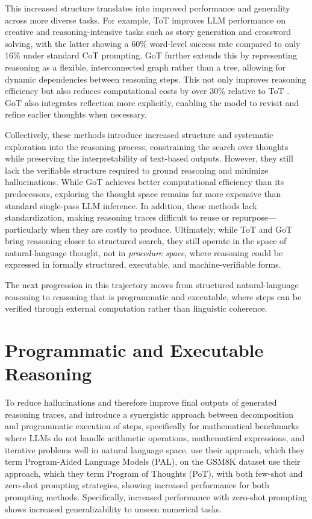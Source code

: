 \documentclass[project]{bsu-cs}  %
\begin{document}
This increased structure translates into improved performance and generality across more diverse tasks. For example, ToT improves LLM performance on creative and reasoning-intensive tasks such as story generation and crossword solving, with the latter showing a 60\% word-level success rate compared to only 16\% under standard CoT prompting. GoT further extends this by representing reasoning as a flexible, interconnected graph rather than a tree, allowing for dynamic dependencies between reasoning steps. This not only improves reasoning efficiency but also reduces computational costs by over 30\% relative to ToT \citep{Besta_2024}. GoT also integrates reflection more explicitly, enabling the model to revisit and refine earlier thoughts when necessary.

Collectively, these methods introduce increased structure and systematic exploration into the reasoning process, constraining the search over thoughts while preserving the interpretability of text-based outputs. However, they still lack the verifiable structure required to ground reasoning and minimize hallucinations. While GoT achieves better computational efficiency than its predecessors, exploring the thought space remains far more expensive than standard single-pass LLM inference. In addition, these methods lack standardization, making reasoning traces difficult to reuse or repurpose—particularly when they are costly to produce. Ultimately, while ToT and GoT bring reasoning closer to structured search, they still operate in the space of natural-language thought, not in \textit{procedure space}, where reasoning could be expressed in formally structured, executable, and machine-verifiable forms.

The next progression in this trajectory moves from structured natural-language reasoning to reasoning that is programmatic and executable, where steps can be verified through external computation rather than linguistic coherence.
% 
%
%
% 
\section{Programmatic and Executable Reasoning}\label{sec:programmatic}
% 
To reduce hallucinations and therefore improve final outputs of generated reasoning traces, \citet{gao2023palprogramaidedlanguagemodels} and \citet{chen2023programthoughtspromptingdisentangling} introduce a synergistic approach between decomposition and programmatic execution of steps, specifically for mathematical benchmarks where LLMs do not handle arithmetic operations, mathematical expressions, and iterative problems well in natural language space. \citet{gao2023palprogramaidedlanguagemodels} use their approach, which they term Program-Aided Language Models (PAL), on the GSM8K dataset\citet{chen2023programthoughtspromptingdisentangling} use their approach, which they term Program of Thoughts (PoT), with both few-shot and zero-shot prompting strategies, showing increased performance for both prompting methods. Specifically, increased performance with zero-shot prompting shows increased generalizability to unseen numerical tasks. 
\end{document}
